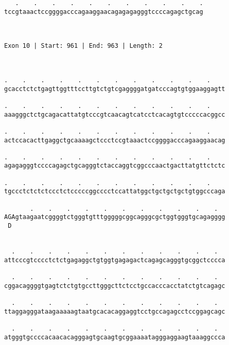 \documentclass{article}
\begin{document}
\begin{Verbatim}
   .    .    .    .    .    .    .    .    .    .    .
tccgtaaactccggggacccagaaggaacagagagagggtccccagagctgcag
                                                      
                                                      
 
Exon 10 | Start: 961 | End: 963 | Length: 2



.    .    .    .    .    .    .    .    .    .    .    .    
gcacctctctgagttggtttccttgtctgtcgaggggatgatcccagtgtggaaggagtt
                                                            
.    .    .    .    .    .    .    .    .    .    .    .    
aaagggctctgcagacattatgtcccgtcaacagtcatcctcacagtgtcccccacggcc
                                                            
.    .    .    .    .    .    .    .    .    .    .    .    
actccacacttgaggctgcaaaagctccctccgtaaactccggggacccagaaggaacag
                                                            
.    .    .    .    .    .    .    .    .    .    .    .    
agagagggtccccagagctgcagggtctaccaggtcggcccaactgacttatgttctctc
                                                            
.    .    .    .    .    .    .    .    .    .    .    .    
tgccctctctctccctctcccccggcccctccattatggctgctgctgctgtggcccaga
                                                            
       .    .    .    .    .    .    .    .    .    .    .  
AGAgtaagaatcggggtctgggtgtttgggggcggcagggcgctggtgggtgcagagggg
 D                                                          
                                                            
  
  .    .    .    .    .    .    .    .    .    .    .    .  
attcccgtcccctctctgagaggctgtggtgagagactcagagcagggtgcggctcccca
                                                            
  .    .    .    .    .    .    .    .    .    .    .    .  
cggacaggggtgagtctctgtgccttgggcttctcctgccacccacctatctgtcagagc
                                                            
  .    .    .    .    .    .    .    .    .    .    .    .  
ttaggagggataagaaaaagtaatgcacacaggaggtcctgccagagcctccggagcagc
                                                            
  .    .    .    .    .    .    .    .    .    .    .    .  
atgggtgccccacaacacagggagtgcaagtgcggaaaatagggaggaagtaaaggccca
                                                            

\end{Verbatim}
\end{document}

